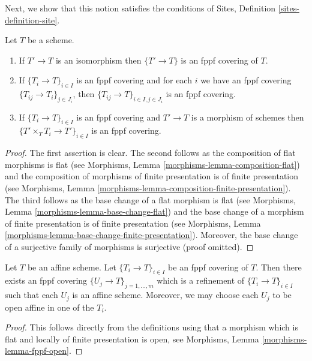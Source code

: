 \noindent
Next, we show that this notion satisfies the conditions of
Sites, Definition \ref{sites-definition-site}.

\begin{lemma}
\label{lemma-fppf}
Let $T$ be a scheme.
\begin{enumerate}
\item If $T' \to T$ is an isomorphism then $\{T' \to T\}$
is an fppf covering of $T$.
\item If $\{T_i \to T\}_{i\in I}$ is an fppf covering and for each
$i$ we have an fppf covering $\{T_{ij} \to T_i\}_{j\in J_i}$, then
$\{T_{ij} \to T\}_{i \in I, j\in J_i}$ is an fppf covering.
\item If $\{T_i \to T\}_{i\in I}$ is an fppf covering
and $T' \to T$ is a morphism of schemes then
$\{T' \times_T T_i \to T'\}_{i\in I}$ is an fppf covering.
\end{enumerate}
\end{lemma}

\begin{proof}
The first assertion is clear.
The second follows as the composition of flat morphisms is flat
(see Morphisms, Lemma \ref{morphisms-lemma-composition-flat})
and the composition of morphisms of finite presentation is
of finite presentation
(see Morphisms, Lemma \ref{morphisms-lemma-composition-finite-presentation}).
The third follows as the base change of a flat morphism is flat
(see Morphisms, Lemma \ref{morphisms-lemma-base-change-flat})
and the base change of a morphism of finite presentation is
of finite presentation
(see Morphisms, Lemma \ref{morphisms-lemma-base-change-finite-presentation}).
Moreover, the base change of a surjective family of morphisms is surjective
(proof omitted).
\end{proof}

\begin{lemma}
\label{lemma-fppf-affine}
Let $T$ be an affine scheme.
Let $\{T_i \to T\}_{i \in I}$ be an fppf covering of $T$.
Then there exists an fppf covering
$\{U_j \to T\}_{j = 1, \ldots, m}$ which is a refinement
of $\{T_i \to T\}_{i \in I}$ such that each $U_j$ is an affine
scheme. Moreover, we may choose each $U_j$ to be open affine
in one of the $T_i$.
\end{lemma}

\begin{proof}
This follows directly from the definitions using that a
morphism which is flat and locally of finite presentation is open,
see Morphisms, Lemma \ref{morphisms-lemma-fppf-open}.
\end{proof}

